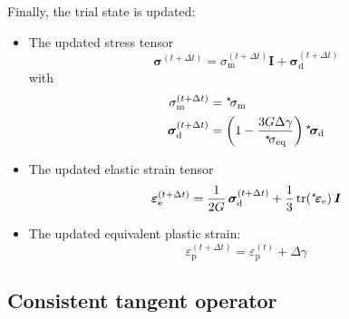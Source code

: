 \documentclass[times,namecite]{goose-article}
\newcommand\leftstar[1]{\hspace*{-.3em}~^\star\!#1}
\begin{document}
Finally, the trial state is updated:
\begin{itemize}
%
\item The updated stress tensor
\begin{equation}
  \bm{\sigma}^{(t+\Delta t)}
  = \sigma_\mathrm{m}^{(t+\Delta t)} \bm{I} + \bm{\sigma}_\mathrm{d}^{(t+\Delta t)}
\end{equation}
with
\begin{align}
  \sigma_\mathrm{m}^{(t+\Delta t)}
  &=
  \leftstar{\sigma}_\mathrm{m}
  \\
  \bm{\sigma}_\mathrm{d}^{(t+\Delta t)}
  &=
  \left( 1 - \frac{3 G \Delta \gamma}{\leftstar{\sigma}_\mathrm{eq}} \right)
  \leftstar{\bm{\sigma}}_\mathrm{d}
\end{align}
%
\item The updated elastic strain tensor
\begin{equation}
  \bm{\varepsilon}_\mathrm{e}^{(t+\Delta t)}
  =
  \frac{1}{2G} \, \bm{\sigma}^{(t+\Delta t)}_\mathrm{d} +
  \frac{1}{3} \, \mathrm{tr} (\leftstar{\bm{\varepsilon}}_\mathrm{e}) \, \bm{I}
\end{equation}
%
\item The updated equivalent plastic strain:
\begin{equation}
  \varepsilon_\mathrm{p}^{(t+\Delta t)} = \varepsilon_\mathrm{p}^{(t)} + \Delta \gamma
\end{equation}
%
\end{itemize}

\subsection{Consistent tangent operator}
\end{document}
